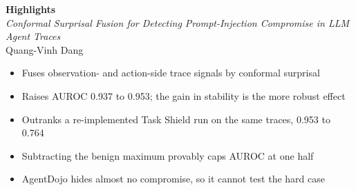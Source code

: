 \documentclass[11pt]{article}
\begin{document}
\begin{center}
{\large\bfseries Highlights}\\[0.5em]
\emph{Conformal Surprisal Fusion for Detecting Prompt-Injection Compromise in
LLM Agent Traces}\\[0.3em]
Quang-Vinh Dang
\end{center}
\vspace{1em}
\begin{itemize}\itemsep0.5em
\item Fuses observation- and action-side trace signals by conformal surprisal
\item Raises AUROC 0.937 to 0.953; the gain in stability is the more robust effect
\item Outranks a re-implemented Task Shield run on the same traces, 0.953 to 0.764
\item Subtracting the benign maximum provably caps AUROC at one half
\item AgentDojo hides almost no compromise, so it cannot test the hard case
\end{itemize}
\end{document}
